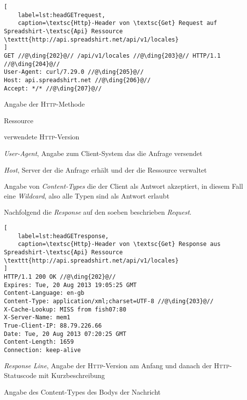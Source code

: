 \begin{lstlisting}[
    label=lst:headGETrequest,
    caption=\textsc{Http}-Header von \textsc{Get} Request auf Spreadshirt-\textsc{Api} Ressource \texttt{http://api.spreadshirt.net/api/v1/locales}
]
GET //@\ding{202}@// /api/v1/locales //@\ding{203}@// HTTP/1.1 //@\ding{204}@//
User-Agent: curl/7.29.0 //@\ding{205}@//
Host: api.spreadshirt.net //@\ding{206}@//
Accept: */* //@\ding{207}@//
\end{lstlisting} 

\begin{compactitem}
    \item[\ding{202}] Angabe der \textsc{Http}-Methode
    \item[\ding{203}] Ressource
    \item[\ding{204}] verwendete \textsc{Http}-Version
    \item[\ding{205}] \emph{User-Agent}, Angabe zum Client-System das die Anfrage versendet
    \item[\ding{206}] \emph{Host}, Server der die Anfrage erhält und der die Ressource  verwaltet
    \item[\ding{207}] Angabe von \emph{Content-Types} die der Client als Antwort akzeptiert, in diesem Fall eine \emph{Wildcard}, also alle Typen sind als Antwort erlaubt
\end{compactitem}

Nachfolgend die \emph{Response} auf den soeben beschrieben \emph{Request}.

\begin{lstlisting}[
    label=lst:headGETresponse,
    caption=\textsc{Http}-Header von \textsc{Get} Response aus Spreadshirt-\textsc{Api} Ressource \texttt{http://api.spreadshirt.net/api/v1/locales}
]
HTTP/1.1 200 OK //@\ding{202}@//
Expires: Tue, 20 Aug 2013 19:05:25 GMT
Content-Language: en-gb
Content-Type: application/xml;charset=UTF-8 //@\ding{203}@//
X-Cache-Lookup: MISS from fish07:80
X-Server-Name: mem1
True-Client-IP: 88.79.226.66
Date: Tue, 20 Aug 2013 07:20:25 GMT
Content-Length: 1659
Connection: keep-alive
\end{lstlisting}

\begin{compactitem}
    \item[\ding{202}] \emph{Response Line}, Angabe der \textsc{Http}-Version am Anfang und danach der \textsc{Http}-Statuscode mit Kurzbeschreibung
    \item[\ding{203}] Angabe des Content-Types des Bodys der Nachricht
\end{compactitem}

